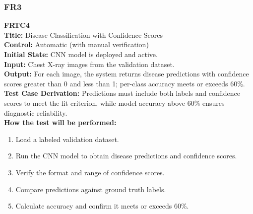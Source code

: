 \documentclass[12pt, titlepage]{article}
\begin{document}
\vspace{1em}

\subsubsection{FR3}



\textbf{FRTC4}\\
\textbf{Title:} Disease Classification with Confidence Scores\\
\textbf{Control:} Automatic (with manual verification)\\
\textbf{Initial State:} CNN model is deployed and active.\\
\textbf{Input:} Chest X-ray images from the validation dataset.\\
\textbf{Output:} For each image, the system returns disease predictions with confidence scores greater than 0 and less than 1; per-class accuracy meets or exceeds 60\%.\\
\textbf{Test Case Derivation:} Predictions must include both labels and confidence scores to meet the fit criterion, while model accuracy above 60\% ensures diagnostic reliability.\\
\textbf{How the test will be performed:}
\begin{enumerate}
  \item Load a labeled validation dataset.
  \item Run the CNN model to obtain disease predictions and confidence scores.
  \item Verify the format and range of confidence scores.
  \item Compare predictions against ground truth labels.
  \item Calculate accuracy and confirm it meets or exceeds 60\%.
\end{enumerate}

\vspace{1em}
\end{document}
